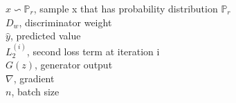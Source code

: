 \begin{flushleft}
$x \backsim \mathbb{P} _{r}$, sample x that has probability distribution $\mathbb{P}_r$\\
\vspace{\baselineskip}
$D_w$, discriminator weight\\
\vspace{\baselineskip}
$\hat{y}$, predicted value\\
\vspace{\baselineskip}
$L_2^{(i)}$, second loss term at iteration i\\
\vspace{\baselineskip}
$G(z)$, generator output\\
\vspace{\baselineskip}
$\nabla$, gradient\\
\vspace{\baselineskip}
$n$, batch size
\end{flushleft}